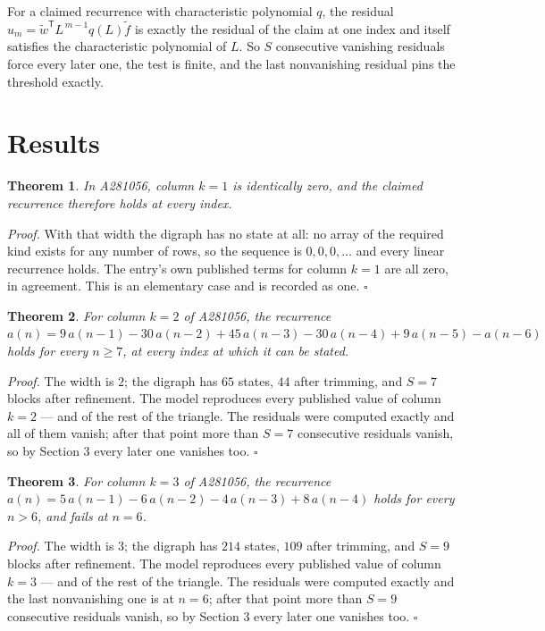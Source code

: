 \documentclass[11pt]{article}
\newtheorem{theorem}{Theorem}
\theoremstyle{definition}
\begin{document}
For a claimed recurrence with characteristic polynomial $q$, the residual $u_m = \tilde w^{\mathsf T}L^{\,m-1}q(L)\tilde f$ is exactly the residual of the claim at one index and itself satisfies the characteristic polynomial of $L$. So $S$ consecutive vanishing residuals force every later one, the test is finite, and the last nonvanishing residual pins the threshold exactly.

\section{Results}

\begin{theorem} In A281056, column $k = 1$ is identically zero, and the claimed recurrence therefore holds at every index.\end{theorem}

{\itshape Proof.} With that width the digraph has no state at all: no array of the required kind exists for any number of rows, so the sequence is $0,0,0,\dots$ and every linear recurrence holds. The entry's own published terms for column $k = 1$ are all zero, in agreement. This is an elementary case and is recorded as one. $\square$

\begin{theorem} For column $k = 2$ of A281056, the recurrence $a(n) = 9\,a(n-1) - 30\,a(n-2) + 45\,a(n-3) - 30\,a(n-4) + 9\,a(n-5) - a(n-6)$ holds for every $n \ge 7$, at every index at which it can be stated.\end{theorem}

{\itshape Proof.} The width is $2$; the digraph has $65$ states, $44$ after trimming, and $S = 7$ blocks after refinement. The model reproduces every published value of column $k = 2$ --- and of the rest of the triangle. The residuals were computed exactly and all of them vanish; after that point more than $S = 7$ consecutive residuals vanish, so by Section 3 every later one vanishes too. $\square$

\begin{theorem} For column $k = 3$ of A281056, the recurrence $a(n) = 5\,a(n-1) - 6\,a(n-2) - 4\,a(n-3) + 8\,a(n-4)$ holds for every $n > 6$, and fails at $n = 6$.\end{theorem}

{\itshape Proof.} The width is $3$; the digraph has $214$ states, $109$ after trimming, and $S = 9$ blocks after refinement. The model reproduces every published value of column $k = 3$ --- and of the rest of the triangle. The residuals were computed exactly and the last nonvanishing one is at $n = 6$; after that point more than $S = 9$ consecutive residuals vanish, so by Section 3 every later one vanishes too. $\square$
\end{document}
